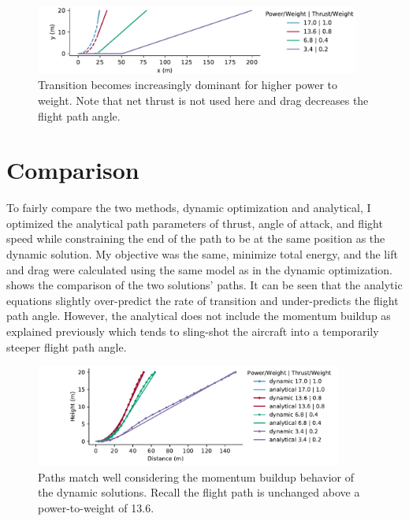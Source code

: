\documentclass[10pt,english]{article}
\begin{document}
\begin{figure}[H]
\centering
\includegraphics[trim={.6cm 0.5cm .1cm 0cm},clip,width=0.95\textwidth]{position}
\caption{Transition becomes increasingly dominant for higher power to weight.  Note that net thrust is not used here and drag decreases the flight path angle.}
\label{f:analytical_takeoff}
\end{figure}




\section{Comparison}

To fairly compare the two methods, dynamic optimization and analytical, I optimized the analytical path parameters of thrust, angle of attack, and flight speed while constraining the end of the path to be at the same position as the dynamic solution.  My objective was the same, minimize total energy, and the lift and drag were calculated using the same model as in the dynamic optimization.   shows the comparison of the two solutions' paths.  It can be seen that the analytic equations slightly over-predict the rate of transition and under-predicts the flight path angle.  However, the analytical does not include the momentum buildup as explained previously which tends to sling-shot the aircraft into a temporarily steeper flight path angle.

\begin{figure}[H]
\centering
\includegraphics[trim={2.1cm 0.0cm .6cm 0cm},clip,width=0.9\textwidth]{pn_pd_compare}
\vspace{-5pt}
\caption{Paths match well considering the momentum buildup behavior of the dynamic solutions. Recall the flight path is unchanged above a power-to-weight of 13.6.}
\label{f:comparison}
\end{figure}
\end{document}
